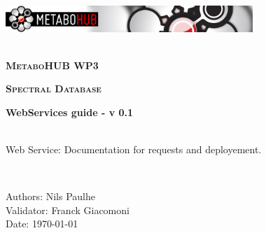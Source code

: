 
\begin{titlepage}

\begin{center}

\includegraphics[width=0.7\textwidth]{./files/images/mth_title.jpg}\\[1cm] 

\HRule \\[0.4cm]
\begin{center} { \textsc{\large { \huge \bfseries Metabo{\color{mthRed}HUB} WP3 \\}} } \end{center} %
\begin{center} { \textsc{\large { \huge \bfseries Spectral Database}} } \end{center} %
\begin{center} { \huge \bfseries WebServices guide - v 0.1} \end{center} 

\HRule \\[0.4cm]

 \large Web Service: Documentation for requests and deployement.

\HRule \\[1.5cm]

\begin{flushleft}
 \large
Authors: Nils Paulhe \\[\baselineskip]
Validator: Franck Giacomoni \\[\baselineskip]
Date: \today

\let\thefootnote\relax
{}

\end{flushleft}

\vfill

\end{center}

\end{titlepage}